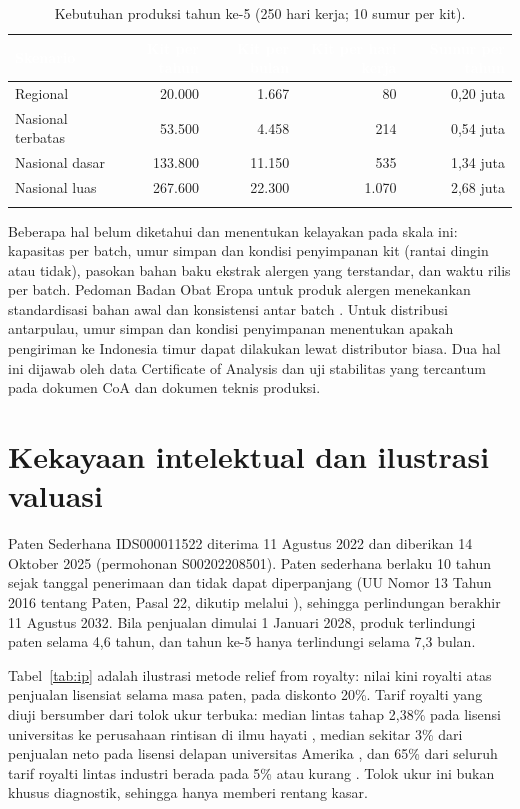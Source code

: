 \documentclass[11pt,a4paper]{article}
\newcommand{\tH}[1]{\textcolor{white}{\sffamily\bfseries\small #1}}
\newcommand{\tabstart}{\small\rowcolors{2}{white}{pale}\arrayrulecolor{rule}}
\newcommand{\hdrrow}{\rowcolor{tealdark}}
\renewcommand{\toprule}{\arrayrulecolor{tealdark}\specialrule{0.9pt}{0pt}{0pt}\arrayrulecolor{rule}}
\renewcommand{\bottomrule}{\arrayrulecolor{tealdark}\specialrule{0.9pt}{0pt}{0pt}\arrayrulecolor{rule}}
\begin{document}
\begin{table}[htbp]
\centering
\caption{Kebutuhan produksi tahun ke-5 (250 hari kerja; 10 sumur per kit).}
\label{tab:cap}
\tabstart
\begin{tabular}{@{}lrrrr@{}}
\toprule
\hdrrow\tH{Skenario} & \tH{Kit per tahun} & \tH{Kit per bulan} & \tH{Kit per hari kerja} & \tH{Sumur per tahun} \\
\midrule
Regional & 20.000 & 1.667 & 80 & 0,20 juta \\
Nasional terbatas & 53.500 & 4.458 & 214 & 0,54 juta \\
Nasional dasar & 133.800 & 11.150 & 535 & 1,34 juta \\
Nasional luas & 267.600 & 22.300 & 1.070 & 2,68 juta \\
\bottomrule
\end{tabular}
\end{table}

Beberapa hal belum diketahui dan menentukan kelayakan pada skala ini: kapasitas per batch, umur simpan dan kondisi penyimpanan kit (rantai dingin atau tidak), pasokan bahan baku ekstrak alergen yang terstandar, dan waktu rilis per batch. Pedoman Badan Obat Eropa untuk produk alergen menekankan standardisasi bahan awal dan konsistensi antar batch \cite{ema}. Untuk distribusi antarpulau, umur simpan dan kondisi penyimpanan menentukan apakah pengiriman ke Indonesia timur dapat dilakukan lewat distributor biasa. Dua hal ini dijawab oleh data Certificate of Analysis dan uji stabilitas yang tercantum pada dokumen CoA dan dokumen teknis produksi.

\section{Kekayaan intelektual dan ilustrasi valuasi}

Paten Sederhana IDS000011522 diterima 11 Agustus 2022 dan diberikan 14 Oktober 2025 (permohonan S00202208501). Paten sederhana berlaku 10 tahun sejak tanggal penerimaan dan tidak dapat diperpanjang (UU Nomor 13 Tahun 2016 tentang Paten, Pasal 22, dikutip melalui \cite{izin}), sehingga perlindungan berakhir 11 Agustus 2032. Bila penjualan dimulai 1 Januari 2028, produk terlindungi paten selama 4,6 tahun, dan tahun ke-5 hanya terlindungi selama 7,3 bulan.

Tabel~\ref{tab:ip} adalah ilustrasi metode relief from royalty: nilai kini royalti atas penjualan lisensiat selama masa paten, pada diskonto 20\%. Tarif royalti yang diuji bersumber dari tolok ukur terbuka: median lintas tahap 2,38\% pada lisensi universitas ke perusahaan rintisan di ilmu hayati \cite{gd}, median sekitar 3\% dari penjualan neto pada lisensi delapan universitas Amerika \cite{bvr}, dan 65\% dari seluruh tarif royalti lintas industri berada pada 5\% atau kurang \cite{lesi}. Tolok ukur ini bukan khusus diagnostik, sehingga hanya memberi rentang kasar.
\end{document}
